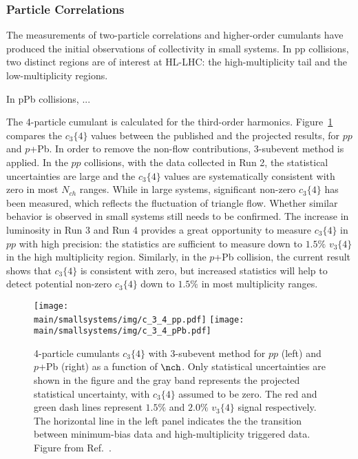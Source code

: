\documentclass[../report.tex]{subfiles}
\providecommand{\main}{..}
\begin{document}
\subsubsection{Particle Correlations}

The measurements of two-particle correlations and higher-order cumulants have produced the initial observations of collectivity in small systems. In pp collisions, two distinct regions are of interest at HL-LHC: the high-multiplicity tail and the low-multiplicity regions. 

In pPb collisions, ...

The 4-particle cumulant is calculated for the third-order harmonics. Figure~\ref{fig:smallsystems_corr_cumulants} compares the $c_3\{4\}$ values between the published and the projected results, for $pp$ and $p$+Pb. In order to remove the non-flow contributions, 3-subevent method is applied. In the $pp$ collisions, with the data collected in Run 2, the statistical uncertainties are large and the $c_3\{4\}$ values are systematically consistent with zero in most $N_{ch}$ ranges. While in large systems, significant non-zero $c_3\{4\}$ has been measured, which reflects the fluctuation of triangle flow. Whether similar behavior is observed in small systems still needs to be confirmed. The increase in luminosity in Run 3 and Run 4 provides a great opportunity to measure $c_3\{4\}$ in $pp$ with high precision: the statistics are sufficient to measure down to $1.5\%$ $v_3\{4\}$ in the high multiplicity region. Similarly, in the $p$+Pb collision, the current result shows that $c_3\{4\}$ is consistent with zero, but increased statistics will help to detect potential non-zero $c_3\{4\}$ down to $1.5\%$ in most multiplicity ranges.

\begin{figure}[ht]
\centering
\texttt{[image: \\main/smallsystems/img/c\_3\_4\_pp.pdf]}
\texttt{[image: \\main/smallsystems/img/c\_3\_4\_pPb.pdf]}
\caption{4-particle cumulants $c_3\{4\}$ with 3-subevent method for $pp$ (left) and $p$+Pb (right) as a function of $\nch$. Only statistical uncertainties are shown in the figure and the gray band represents the projected statistical uncertainty, with $c_3\{4\}$ assumed to be zero. The red and green dash lines represent $1.5\%$ and $2.0\%$ $v_3\{4\}$ signal respectively. The horizontal line in the left panel indicates the the transition between minimum-bias data and high-multiplicity triggered data. Figure from Ref.~\cite{}.}
\label{fig:smallsystems_corr_cumulants}
\end{figure}
\end{document}
